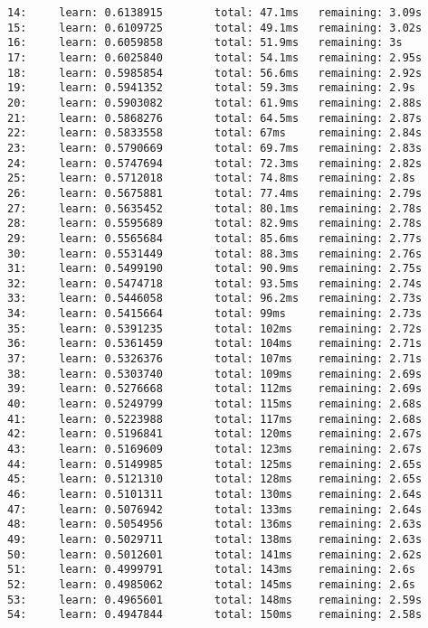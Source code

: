 \documentclass[11pt]{article}
\begin{document}
\begin{Verbatim}[commandchars=\\\{\}]
14:     learn: 0.6138915        total: 47.1ms   remaining: 3.09s
15:     learn: 0.6109725        total: 49.1ms   remaining: 3.02s
16:     learn: 0.6059858        total: 51.9ms   remaining: 3s
17:     learn: 0.6025840        total: 54.1ms   remaining: 2.95s
18:     learn: 0.5985854        total: 56.6ms   remaining: 2.92s
19:     learn: 0.5941352        total: 59.3ms   remaining: 2.9s
20:     learn: 0.5903082        total: 61.9ms   remaining: 2.88s
21:     learn: 0.5868276        total: 64.5ms   remaining: 2.87s
22:     learn: 0.5833558        total: 67ms     remaining: 2.84s
23:     learn: 0.5790669        total: 69.7ms   remaining: 2.83s
24:     learn: 0.5747694        total: 72.3ms   remaining: 2.82s
25:     learn: 0.5712018        total: 74.8ms   remaining: 2.8s
26:     learn: 0.5675881        total: 77.4ms   remaining: 2.79s
27:     learn: 0.5635452        total: 80.1ms   remaining: 2.78s
28:     learn: 0.5595689        total: 82.9ms   remaining: 2.78s
29:     learn: 0.5565684        total: 85.6ms   remaining: 2.77s
30:     learn: 0.5531449        total: 88.3ms   remaining: 2.76s
31:     learn: 0.5499190        total: 90.9ms   remaining: 2.75s
32:     learn: 0.5474718        total: 93.5ms   remaining: 2.74s
33:     learn: 0.5446058        total: 96.2ms   remaining: 2.73s
34:     learn: 0.5415664        total: 99ms     remaining: 2.73s
35:     learn: 0.5391235        total: 102ms    remaining: 2.72s
36:     learn: 0.5361459        total: 104ms    remaining: 2.71s
37:     learn: 0.5326376        total: 107ms    remaining: 2.71s
38:     learn: 0.5303740        total: 109ms    remaining: 2.69s
39:     learn: 0.5276668        total: 112ms    remaining: 2.69s
40:     learn: 0.5249799        total: 115ms    remaining: 2.68s
41:     learn: 0.5223988        total: 117ms    remaining: 2.68s
42:     learn: 0.5196841        total: 120ms    remaining: 2.67s
43:     learn: 0.5169609        total: 123ms    remaining: 2.67s
44:     learn: 0.5149985        total: 125ms    remaining: 2.65s
45:     learn: 0.5121310        total: 128ms    remaining: 2.65s
46:     learn: 0.5101311        total: 130ms    remaining: 2.64s
47:     learn: 0.5076942        total: 133ms    remaining: 2.64s
48:     learn: 0.5054956        total: 136ms    remaining: 2.63s
49:     learn: 0.5029711        total: 138ms    remaining: 2.63s
50:     learn: 0.5012601        total: 141ms    remaining: 2.62s
51:     learn: 0.4999791        total: 143ms    remaining: 2.6s
52:     learn: 0.4985062        total: 145ms    remaining: 2.6s
53:     learn: 0.4965601        total: 148ms    remaining: 2.59s
54:     learn: 0.4947844        total: 150ms    remaining: 2.58s

\end{Verbatim}
\end{document}

